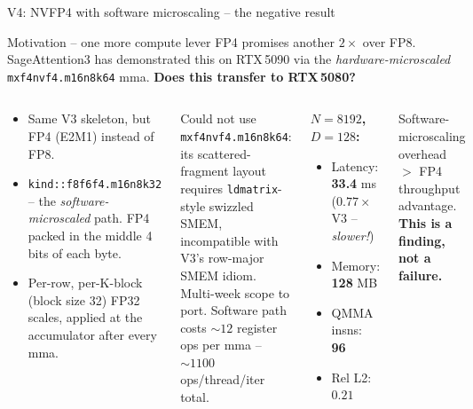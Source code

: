 \documentclass[10pt,aspectratio=169]{beamer}
\begin{document}
\begin{frame}{V4: NVFP4 with software microscaling -- the negative result}
  \begin{block}{Motivation -- one more compute lever}
    FP4 promises another $2\times$ over FP8. SageAttention3 has
    demonstrated this on RTX\,5090 via the \emph{hardware-microscaled}
    \texttt{mxf4nvf4.m16n8k64} mma. \textbf{Does this transfer to
    RTX\,5080?}
  \end{block}
  \begin{columns}[T]
      \begin{whatif}
        \begin{itemize}
          \item Same V3 skeleton, but FP4 (E2M1) instead of FP8.
          \item \texttt{kind::f8f6f4.m16n8k32} -- the
                \emph{software-microscaled} path. FP4 packed in the
                middle 4 bits of each byte.
          \item Per-row, per-K-block (block size 32) FP32 scales,
                applied at the accumulator after every mma.
        \end{itemize}
      \end{whatif}
      \begin{whatbroke}
        Could not use \texttt{mxf4nvf4.m16n8k64}: its scattered-fragment
        layout requires \texttt{ldmatrix}-style swizzled SMEM,
        incompatible with V3's row-major SMEM idiom. Multi-week scope
        to port. Software path costs $\sim 12$ register ops per mma --
        $\sim 1100$ ops/thread/iter total.
      \end{whatbroke}
      \begin{numbers}
        \textbf{$N = 8192$, $D = 128$:}
        \begin{itemize}
          \item Latency: \textbf{33.4} ms\\
                ($\mathbf{0.77\times}$ V3 -- \emph{slower!})
          \item Memory: \textbf{128} MB
          \item QMMA insns: \textbf{96}
          \item Rel L2: $0.21$
        \end{itemize}
      \end{numbers}
      \begin{spoiler}
        Software-microscaling overhead $>$ FP4 throughput advantage.
        \textbf{This is a finding, not a failure.}
      \end{spoiler}
  \end{columns}
\end{frame}
\end{document}
